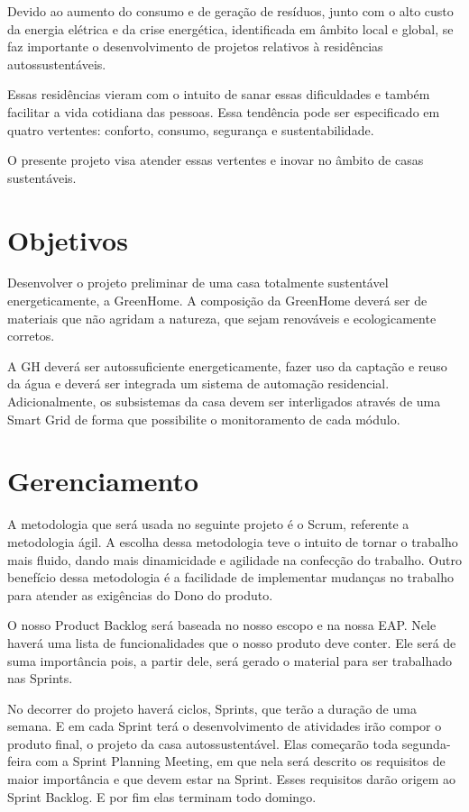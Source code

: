 	Devido ao aumento do consumo e de geração de resíduos, junto com o alto custo da energia elétrica e da crise energética, identificada em âmbito local e global, se faz importante o desenvolvimento de projetos relativos à residências autossustentáveis.

	Essas residências vieram com o intuito de sanar essas dificuldades e também facilitar a vida cotidiana das pessoas. Essa tendência pode ser especificado em quatro vertentes: conforto, consumo, segurança e sustentabilidade.

	O presente projeto visa atender essas vertentes e inovar no âmbito de casas sustentáveis.


\section{Objetivos}

	Desenvolver o projeto preliminar de uma casa totalmente sustentável energeticamente, a GreenHome. A composição da GreenHome deverá ser de materiais que não agridam a natureza, que sejam renováveis e ecologicamente corretos.

	A GH deverá ser autossuficiente energeticamente, fazer uso da captação e reuso da água e deverá ser integrada um sistema de automação residencial. Adicionalmente, os subsistemas da casa devem ser interligados através de uma Smart Grid de forma que possibilite o monitoramento de cada módulo.

\section{Gerenciamento}

	A metodologia que será usada no seguinte projeto é o Scrum, referente a metodologia ágil. A escolha dessa metodologia teve o intuito de tornar o trabalho mais fluido, dando mais dinamicidade e agilidade na confecção do trabalho. Outro benefício dessa metodologia é a facilidade de implementar mudanças no trabalho para atender as exigências do Dono do produto.

	O nosso Product Backlog será baseada no nosso escopo e na nossa EAP. Nele haverá uma lista de funcionalidades que o nosso produto deve conter. Ele será de suma importância pois, a partir dele, será gerado o material para ser trabalhado nas Sprints.

	No decorrer do projeto haverá ciclos, Sprints, que terão a duração de uma semana. E em cada Sprint terá o desenvolvimento de atividades irão compor o produto final, o projeto da casa autossustentável. Elas começarão toda segunda-feira com a Sprint Planning Meeting, em que nela será descrito os requisitos de maior importância e que devem estar na Sprint. Esses requisitos darão origem ao Sprint Backlog. E por fim elas terminam todo domingo.

